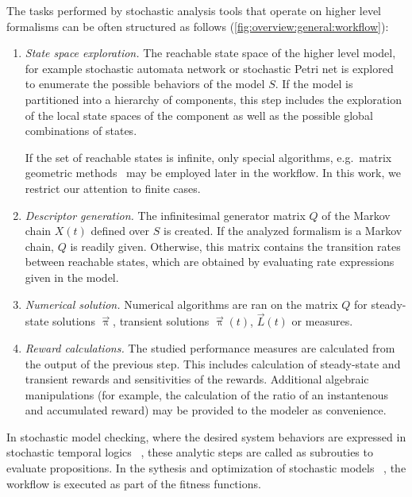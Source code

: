The tasks performed by stochastic analysis tools that operate on
higher level formalisms can be often structured as follows
(\vref{fig:overview:general:workflow}):
\begin{enumerate}
\item \emph{State space exploration.} The reachable state space of the
  higher level model, for example stochastic automata network or
  stochastic Petri net is explored to enumerate the possible behaviors
  of the model $S$. If the model is partitioned into a hierarchy of
  components, this step includes the exploration of the local state
  spaces of the component as well as the possible global combinations
  of states.

  If the set of reachable states is infinite, only special algorithms,
  e.g.~matrix geometric methods~\citep{haverkort1995matrix} may be
  employed later in the workflow. In this work, we restrict our
  attention to finite cases.
\item \emph{Descriptor generation.} The infinitesimal generator matrix
  $Q$ of the Markov chain $X(t)$ defined over $S$ is created. If the
  analyzed formalism is a Markov chain, $Q$ is readily
  given. Otherwise, this matrix contains the transition rates between
  reachable states, which are obtained by evaluating rate expressions
  given in the model.
\item \emph{Numerical solution.} Numerical algorithms are ran on the
  matrix $Q$ for steady-state solutions $\vec{\uppi}$, transient
  solutions $\vec{\uppi}(t)$, $\vec{L}(t)$ or  measures.
\item \emph{Reward calculations.} The studied performance measures are
  calculated from the output of the previous step. This includes
  calculation of steady-state and transient rewards and sensitivities
  of the rewards. Additional algebraic manipulations (for example, the
  calculation of the ratio of an instantenous and accumulated reward)
  may be provided to the modeler as convenience.

\end{enumerate}

In stochastic model checking, where the desired system behaviors are
expressed in stochastic temporal logics%
~\citep{bianco1995model,baier1999approximative}, these analytic steps
are called as subrouties to evaluate propositions. In the sythesis and
optimization of stochastic models%
~\citep{DBLP:journals/jacm/ChatterjeeHJ015}, the workflow is executed
as part of the fitness functions.

